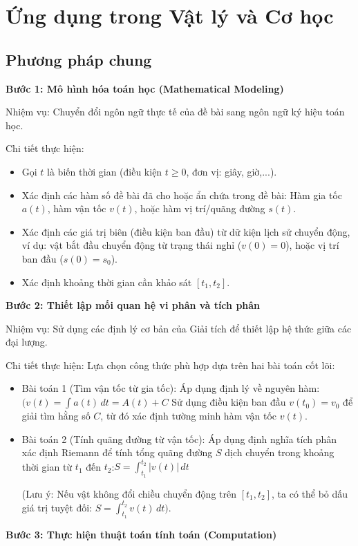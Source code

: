 \documentclass[12pt,a4paper,oneside]{book}
\theoremstyle{theorem}
\theoremstyle{definition}
\begin{document}
    \section{Ứng dụng trong Vật lý và Cơ học}
\subsection{Phương pháp chung}
\textbf{Bước 1: Mô hình hóa toán học (Mathematical Modeling)}

Nhiệm vụ: Chuyển đổi ngôn ngữ thực tế của đề bài sang ngôn ngữ ký hiệu toán học.

Chi tiết thực hiện:
\begin{itemize}
    \item Gọi $t$ là biến thời gian (điều kiện $t \ge 0$, đơn vị: giây, giờ,...).
    \item Xác định các hàm số đề bài đã cho hoặc ẩn chứa trong đề bài: Hàm gia tốc $a(t)$, hàm vận tốc $v(t)$, hoặc hàm vị trí/quãng đường $s(t)$.
    \item Xác định các giá trị biên (điều kiện ban đầu) từ dữ kiện lịch sử chuyển động, ví dụ: vật bắt đầu chuyển động từ trạng thái nghỉ ($ v(0) = 0$), hoặc vị trí ban đầu ($s(0) = s_0$).
    \item Xác định khoảng thời gian cần khảo sát $[t_1, t_2]$.
\end{itemize}

\textbf{Bước 2: Thiết lập mối quan hệ vi phân và tích phân}

Nhiệm vụ: Sử dụng các định lý cơ bản của Giải tích để thiết lập hệ thức giữa các đại lượng.

Chi tiết thực hiện: Lựa chọn công thức phù hợp dựa trên hai bài toán cốt lõi:
\begin{itemize}
    \item Bài toán 1 (Tìm vận tốc từ gia tốc): Áp dụng định lý về nguyên hàm: $(v(t)=\int a(t)\,dt=A(t)+C$ Sử dụng điều kiện ban đầu $v(t_0) = v_0$ để giải tìm hằng số $C$, từ đó xác định tường minh hàm vận tốc $v(t)$.
    \item Bài toán 2 (Tính quãng đường từ vận tốc): Áp dụng định nghĩa tích phân xác định Riemann để tính tổng quãng đường $S$ dịch chuyển trong khoảng thời gian từ $t_{1}$ đến $t_{2}$:$S=\int _{t_{1}}^{t_{2}}|{}v(t)|{}\,dt$

(Lưu ý: Nếu vật không đổi chiều chuyển động trên $[t_1, t_2]$, ta có thể bỏ dấu giá trị tuyệt đối: $S = \int_{t_1}^{t_2} v(t) \, dt)$.
\end{itemize}

\textbf{Bước 3: Thực hiện thuật toán tính toán (Computation)}
\end{document}
